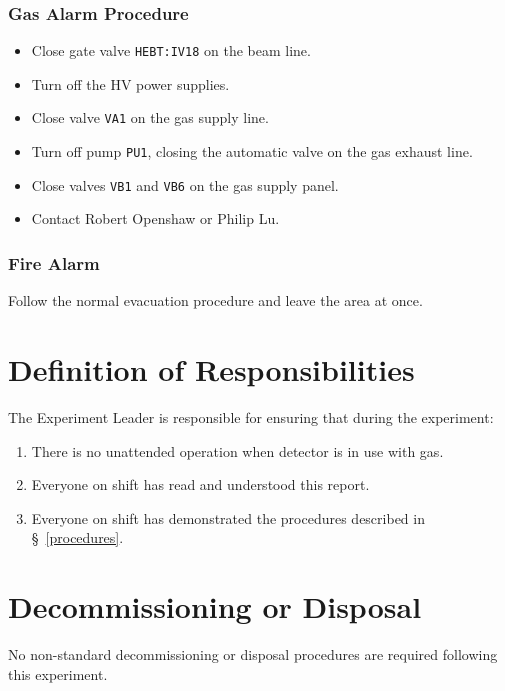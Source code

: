 \subsubsection{Gas Alarm Procedure}
\begin{itemize}
\setlength{\itemsep}{0pt}
\setlength{\parskip}{0pt}
\setlength{\parsep}{0pt}

\item Close gate valve \texttt{HEBT:IV18} on the beam line.
\item Turn off the HV power supplies.
\item Close valve \texttt{VA1} on the gas supply line.
\item Turn off pump \texttt{PU1}, closing the automatic valve on the gas exhaust line.
\item Close valves \texttt{VB1} and \texttt{VB6} on the gas supply panel.
\item Contact Robert Openshaw or Philip Lu.
\end{itemize}
\subsubsection{Fire Alarm}
Follow the normal evacuation procedure and leave the area at once.
\section{Definition of Responsibilities}
The Experiment Leader is responsible for ensuring that during the experiment:
\begin{enumerate}
\setlength{\itemsep}{0pt}
\setlength{\parskip}{0pt}
\setlength{\parsep}{0pt}

\item  There is no unattended operation when detector is in use with gas.
\item  Everyone on shift has read and understood this report.
\item  Everyone on shift has demonstrated the procedures described in \S~\ref{procedures}.
\end{enumerate}
\section{Decommissioning or Disposal}
No non-standard decommissioning or disposal procedures are required following this experiment.

 

